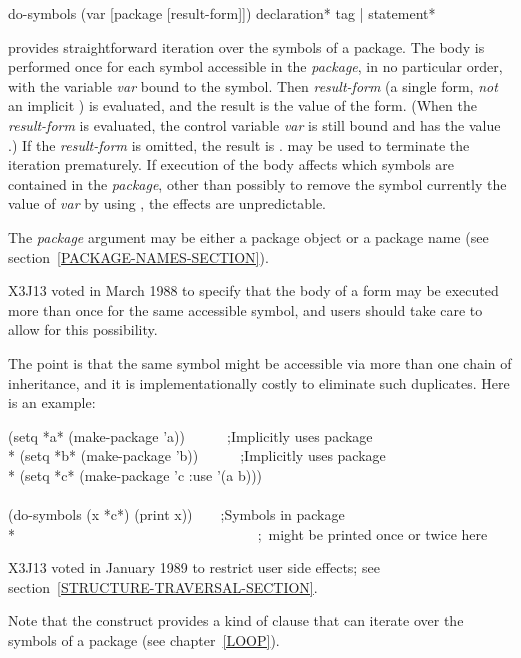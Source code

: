 \begin{defmac}
do-symbols (var [package [result-form]])
           {declaration}* {tag | statement}*

 provides straightforward iteration over the symbols of a
package.  The body is performed once for each symbol accessible in the
\emph{package}, in no particular order, with the variable \emph{var} bound to
the symbol.  Then \emph{result-form} (a single form, \emph{not} an implicit
) is evaluated, and the result is the value of the
 form.  (When the \emph{result-form} is evaluated, the control
variable \emph{var} is still bound and has the value {\false}.)  If the
\emph{result-form} is omitted, the result is {\false}.   may be used
to terminate the iteration prematurely.  If execution of the body affects
which symbols are contained in the \emph{package}, other than possibly to
remove the symbol currently the value of \emph{var} by using ,
the effects are unpredictable.

The \emph{package} argument may be either a package object
or a package name (see section~\ref{PACKAGE-NAMES-SECTION}).

\begin{new}
X3J13 voted in March 1988
to specify that the body of a 
form may be executed more than once for the same accessible symbol, and users
should take care to allow for this possibility.

The point is that the same symbol might be accessible via more than one
chain of inheritance, and it is implementationally costly to eliminate
such duplicates.  Here is an example:
\begin{lisp}
(setq *a* (make-package 'a))~~~~~~;\textrm{Implicitly uses package } \\*
(setq *b* (make-package 'b))~~~~~~;\textrm{Implicitly uses package } \\*
(setq *c* (make-package 'c :use '(a b))) \\
\\
(do-symbols (x *c*) (print x))~~~~;\textrm{Symbols in package } \\*
~~~~~~~~~~~~~~~~~~~~~~~~~~~~~~~~~~;~\textrm{might be printed once or twice here}
\end{lisp}

X3J13 voted in January 1989
to restrict user side effects; see section~\ref{STRUCTURE-TRAVERSAL-SECTION}.
\end{new}
\begin{new}
Note that the  construct provides a kind of  clause that
can iterate over the symbols of a package (see chapter~\ref{LOOP}).
\end{new}
\end{defmac}

